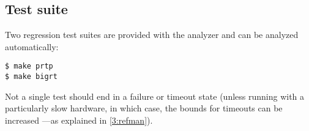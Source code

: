 \subsection{Test suite}
Two regression test suites are provided with the analyzer and can be
analyzed automatically:
\begin{verbatim}
$ make prtp
$ make bigrt
\end{verbatim}
Not a single test should end in a failure or timeout state (unless
running with a particularly slow hardware, in which case, the bounds
for timeouts can be increased ---as explained in \cref{3:refman}).
